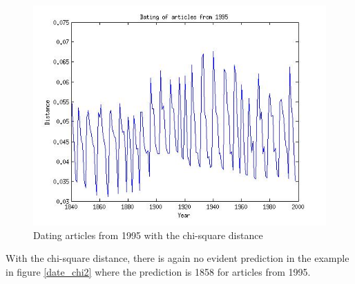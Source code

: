 \begin{figure}[H]
\begin{minipage}[b]{0.3\linewidth}
	\includegraphics[scale=0.25]{Pictures/date_articles/chi2/dating1995_corrected.jpg}
        \caption{Dating articles from 1995 with the chi-square distance}
    \end{minipage}
    \label{date_d1}
\end{figure}
With the chi-square distance, there is again no evident prediction in the example in figure \ref{date_chi2} where the prediction is 1858 for articles from 1995.